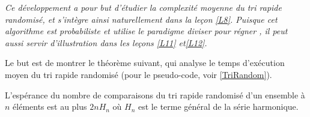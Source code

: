 

\textit{Ce développement a pour but d'étudier la complexité moyenne du tri rapide randomisé, et s'intègre ainsi naturellement dans la leçon \ref{L8}. 
Puisque cet algorithme est probabiliste et utilise le paradigme \og diviser pour régner \fg{} , il peut aussi servir d'illustration dans les leçons \ref{L11} et\ref{L12}. }\newline


Le but est de montrer le théorème suivant, qui analyse le temps d'exécution moyen du tri rapide randomisé (pour le pseudo-code, voir \ref{TriRandom}).

\begin{theorem}
L'espérance du nombre de comparaisons du tri rapide randomisé d'un ensemble à $n$ éléments est au plus $2nH_n$ où $H_n$ est le terme général de la série harmonique.
\end{theorem}

